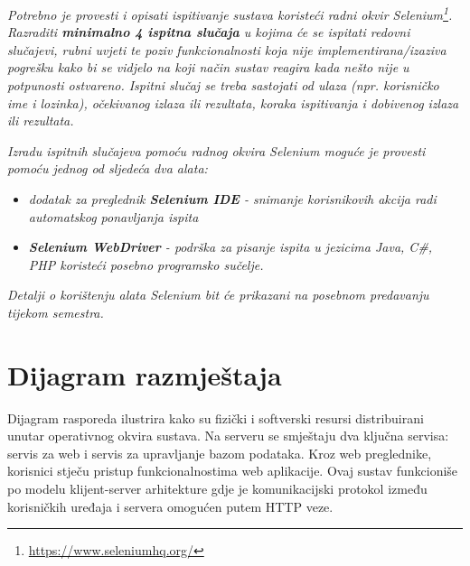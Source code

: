 			 \textit{Potrebno je provesti i opisati ispitivanje sustava koristeći radni okvir Selenium\footnote{\url{https://www.seleniumhq.org/}}. Razraditi \textbf{minimalno 4 ispitna slučaja} u kojima će se ispitati redovni slučajevi, rubni uvjeti te poziv funkcionalnosti koja nije implementirana/izaziva pogrešku kako bi se vidjelo na koji način sustav reagira kada nešto nije u potpunosti ostvareno. Ispitni slučaj se treba sastojati od ulaza (npr. korisničko ime i lozinka), očekivanog izlaza ili rezultata, koraka ispitivanja i dobivenog izlaza ili rezultata.\\ }
			 
			 \textit{Izradu ispitnih slučajeva pomoću radnog okvira Selenium moguće je provesti pomoću jednog od sljedeća dva alata:}
			 \begin{itemize}
			 	\item \textit{dodatak za preglednik \textbf{Selenium IDE} - snimanje korisnikovih akcija radi automatskog ponavljanja ispita	}
			 	\item \textit{\textbf{Selenium WebDriver} - podrška za pisanje ispita u jezicima Java, C\#, PHP koristeći posebno programsko sučelje.}
			 \end{itemize}
		 	\textit{Detalji o korištenju alata Selenium bit će prikazani na posebnom predavanju tijekom semestra.}
			
			\eject 
		
		
		\section{Dijagram razmještaja}
			
			Dijagram rasporeda ilustrira kako su fizički i softverski resursi distribuirani unutar operativnog okvira sustava. Na serveru se smještaju dva ključna servisa: servis za web i servis za upravljanje bazom podataka. Kroz web preglednike, korisnici stječu pristup funkcionalnostima web aplikacije. Ovaj sustav funkcioniše po modelu klijent-server arhitekture gdje je komunikacijski protokol između korisničkih uređaja i servera omogućen putem HTTP veze.

